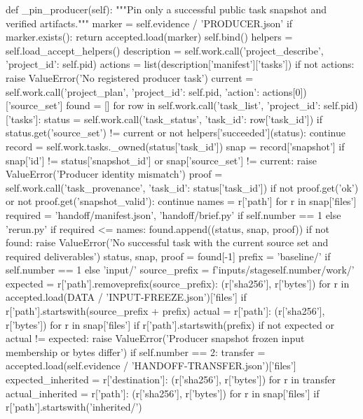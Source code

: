     def _pin_producer(self):
        """Pin only a successful public task snapshot and verified artifacts."""
        marker = self.evidence / 'PRODUCER.json'
        if marker.exists():
            return accepted.load(marker)
        self.bind()
        helpers = self.load_accept_helpers()
        description = self.work.call('project_describe', {'project_id': self.pid})
        actions = list(description['manifest']['tasks'])
        if not actions:
            raise ValueError('No registered producer task')
        current = self.work.call('project_plan', {'project_id': self.pid, 'action': actions[0]})['source_set']
        found = []
        for row in self.work.call('task_list', {'project_id': self.pid})['tasks']:
            status = self.work.call('task_status', {'task_id': row['task_id']})
            if status.get('source_set') != current or not helpers['succeeded'](status):
                continue
            record = self.work.tasks._owned(status['task_id'])
            snap = record['snapshot']
            if snap['id'] != status['snapshot_id'] or snap['source_set'] != current:
                raise ValueError('Producer identity mismatch')
            proof = self.work.call('task_provenance', {'task_id': status['task_id']})
            if not proof.get('ok') or not proof.get('snapshot_valid'):
                continue
            names = {r['path'] for r in snap['files']}
            required = {'handoff/manifest.json', 'handoff/brief.py'} if self.number == 1 else {'rerun.py'}
            if required <= names:
                found.append((status, snap, proof))
        if not found:
            raise ValueError('No successful task with the current source set and required deliverables')
        status, snap, proof = found[-1]
        prefix = 'baseline/' if self.number == 1 else 'input/'
        source_prefix = f'inputs/stage{self.number}/work/'
        expected = {r['path'].removeprefix(source_prefix): (r['sha256'], r['bytes'])
                    for r in accepted.load(DATA / 'INPUT-FREEZE.json')['files']
                    if r['path'].startswith(source_prefix + prefix)}
        actual = {r['path']: (r['sha256'], r['bytes']) for r in snap['files'] if r['path'].startswith(prefix)}
        if not expected or actual != expected:
            raise ValueError('Producer snapshot frozen input membership or bytes differ')
        if self.number == 2:
            transfer = accepted.load(self.evidence / 'HANDOFF-TRANSFER.json')['files']
            expected_inherited = {r['destination']: (r['sha256'], r['bytes']) for r in transfer}
            actual_inherited = {r['path']: (r['sha256'], r['bytes']) for r in snap['files'] if r['path'].startswith('inherited/')}

